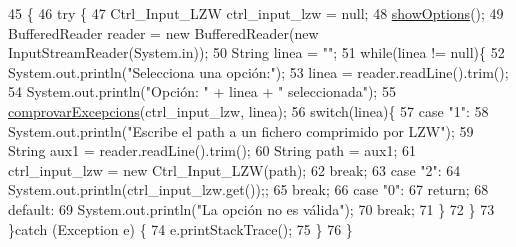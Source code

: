 \begin{DoxyCode}
45                                            \{
46     \textcolor{keywordflow}{try} \{
47         Ctrl\_Input\_LZW ctrl\_input\_lzw = null;
48         \hyperlink{classpersistencia_1_1input_1_1Driver____Ctrl__Input__LZW_a6b5f6f40be349f75d3ac91ecfb453088}{showOptions}();
49         BufferedReader reader = \textcolor{keyword}{new} BufferedReader(\textcolor{keyword}{new} InputStreamReader(System.in));
50         String linea = \textcolor{stringliteral}{""};
51         \textcolor{keywordflow}{while}(linea != null)\{
52             System.out.println(\textcolor{stringliteral}{"Selecciona una opción:"});
53             linea = reader.readLine().trim();
54             System.out.println(\textcolor{stringliteral}{"Opción: "} + linea + \textcolor{stringliteral}{" seleccionada"});
55             \hyperlink{classpersistencia_1_1input_1_1Driver____Ctrl__Input__LZW_a86e186fca84cfae1f5a019b4853a0902}{comprovarExcepcions}(ctrl\_input\_lzw, linea);
56             \textcolor{keywordflow}{switch}(linea)\{
57                 \textcolor{keywordflow}{case} \textcolor{stringliteral}{"1"}:
58                     System.out.println(\textcolor{stringliteral}{"Escribe el path a un fichero comprimido por LZW"});
59                     String aux1 = reader.readLine().trim();
60                     String path = aux1;
61                     ctrl\_input\_lzw = \textcolor{keyword}{new} Ctrl\_Input\_LZW(path);
62                 \textcolor{keywordflow}{break};
63                 \textcolor{keywordflow}{case} \textcolor{stringliteral}{"2"}:
64                     System.out.println(ctrl\_input\_lzw.get());;
65                 \textcolor{keywordflow}{break};
66                 \textcolor{keywordflow}{case} \textcolor{stringliteral}{"0"}:
67                     \textcolor{keywordflow}{return};
68                 \textcolor{keywordflow}{default}:
69                     System.out.println(\textcolor{stringliteral}{"La opción no es válida"});
70                 \textcolor{keywordflow}{break};
71             \}
72         \}
73     \}\textcolor{keywordflow}{catch} (Exception e) \{
74         e.printStackTrace();
75     \}
76     \}
\end{DoxyCode}
\mbox{\label{classpersistencia_1_1input_1_1Driver____Ctrl__Input__LZW_a6b5f6f40be349f75d3ac91ecfb453088}} 
